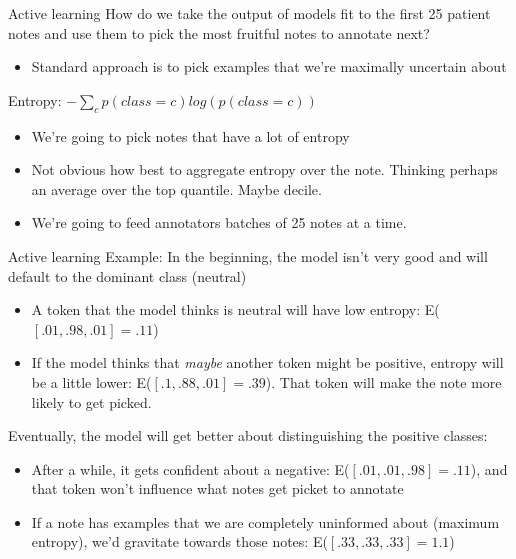 \documentclass[10pt]{beamer}
\begin{document}
\begin{frame}{Active learning}
How do we take the output of models fit to the first 25 patient notes and use them to pick the most fruitful notes to annotate next?
\begin{itemize}
\item Standard approach is to pick examples that we're maximally uncertain about
\end{itemize}
Entropy:  $-\displaystyle\sum_{c}p(class = c)log(p(class = c))$
\begin{itemize}
\item We're going to pick notes that have a lot of entropy
\item Not obvious how best to aggregate entropy over the note.  Thinking perhaps an average over the top quantile.  Maybe decile.
\item We're going to feed annotators batches of 25 notes at a time.
\end{itemize}
\end{frame}

\begin{frame}{Active learning}
Example:  In the beginning, the model isn't very good and will default to the dominant class (neutral)
\begin{itemize}
\item A token that the model thinks is neutral will have low entropy:  E($[.01, .98, .01] = .11$)
\item If the model thinks that \textit{maybe} another token might be positive, entropy will be a little lower:  E($[.1, .88, .01] = .39$).  That token will make the note more likely to get picked.
\end{itemize}
Eventually, the model will get better about distinguishing the positive classes:
\begin{itemize}
\item After a while, it gets confident about a negative:  E($[.01, .01, .98] = .11$), and that token won't influence what notes get picket to annotate
\item If a note has examples that we are completely uninformed about (maximum entropy), we'd gravitate towards those notes:  E($[.33, .33, .33] = 1.1$)
\end{itemize}
\end{frame}
\end{document}
